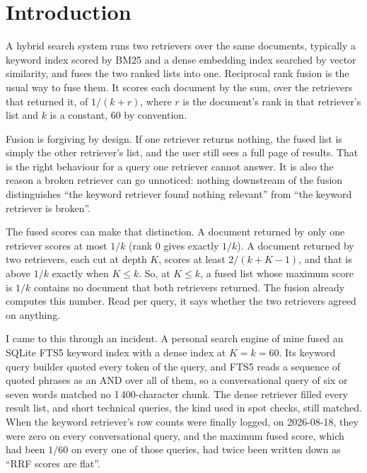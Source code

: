 \documentclass[11pt]{article}
\begin{document}
\section{Introduction}
\label{sec:intro}

A hybrid search system runs two retrievers over the same documents, typically a keyword index scored by BM25 and a dense embedding index searched by vector similarity, and fuses the two ranked lists into one. Reciprocal rank fusion \citep[RRF;][]{cormack2009rrf} is the usual way to fuse them. It scores each document by the sum, over the retrievers that returned it, of $1/(k+r)$, where $r$ is the document's rank in that retriever's list and $k$ is a constant, 60 by convention.

Fusion is forgiving by design. If one retriever returns nothing, the fused list is simply the other retriever's list, and the user still sees a full page of results. That is the right behaviour for a query one retriever cannot answer. It is also the reason a broken retriever can go unnoticed: nothing downstream of the fusion distinguishes ``the keyword retriever found nothing relevant'' from ``the keyword retriever is broken''.

The fused scores can make that distinction. A document returned by only one retriever scores at most $1/k$ (rank 0 gives exactly $1/k$). A document returned by two retrievers, each cut at depth $K$, scores at least $2/(k+K-1)$, and that is above $1/k$ exactly when $K \le k$. So, at $K \le k$, a fused list whose maximum score is $1/k$ contains no document that both retrievers returned. The fusion already computes this number. Read per query, it says whether the two retrievers agreed on anything.

I came to this through an incident. A personal search engine of mine fused an SQLite FTS5 keyword index with a dense index at $K = k = 60$. Its keyword query builder quoted every token of the query, and FTS5 reads a sequence of quoted phrases as an AND over all of them, so a conversational query of six or seven words matched no 1\,400-character chunk. The dense retriever filled every result list, and short technical queries, the kind used in spot checks, still matched. When the keyword retriever's row counts were finally logged, on 2026-08-18, they were zero on every conversational query, and the maximum fused score, which had been $1/60$ on every one of those queries, had twice been written down as ``RRF scores are flat''.
\end{document}
